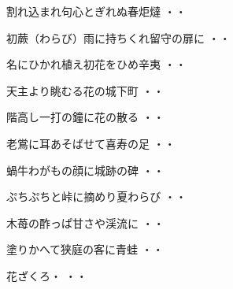 \vspace{0.6cm}
\begin{shiika}割れ込まれ句心とぎれぬ春炬燵
\hfill{・・}\end{shiika}
\vspace{0.6cm}
\begin{shiika}初蕨（わらび）雨に持ちくれ留守の扉に
\hfill{・・}\end{shiika}
\vspace{0.6cm}
\begin{shiika}名にひかれ植え初花をひめ辛夷
\hfill{・・}\end{shiika}
\vspace{0.6cm}
\begin{shiika}天主より眺むる花の城下町
\hfill{・・}\end{shiika}
\vspace{0.6cm}
\begin{shiika}階高し一打の鐘に花の散る
\hfill{・・}\end{shiika}
\vspace{0.6cm}
\begin{shiika}老鴬に耳あそばせて喜寿の足
\hfill{・・}\end{shiika}
\vspace{0.6cm}
\begin{shiika}蝸牛わがもの顔に城跡の碑
\hfill{・・}\end{shiika}
\vspace{0.6cm}
\begin{shiika}ぷちぷちと峠に摘めり夏わらび
\hfill{・・}\end{shiika}
\vspace{0.6cm}
\begin{shiika}木苺の酢っぱ甘さや渓流に
\hfill{・・}\end{shiika}
\vspace{0.6cm}
\begin{shiika}塗りかへて狭庭の客に青蛙
\hfill{・・}\end{shiika}
\vspace{0.6cm}
\begin{shiika}花ざくろ・
\hfill{・・}\end{shiika}

